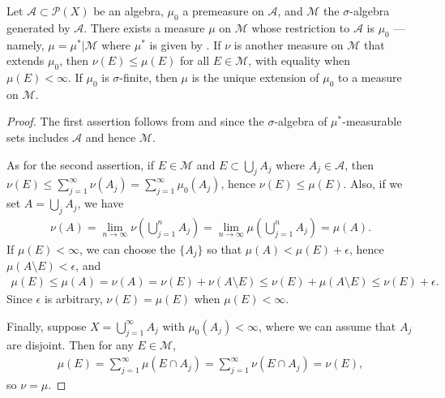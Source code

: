 \begin{theorem}
    Let $\mathcal{A} \subset \mathcal{P}(X)$ be an algebra, $\mu_0$ a premeasure on $\mathcal{A}$, and $\mathcal{M}$ the $\sigma$-algebra generated by $\mathcal{A}$.
    There exists a measure $\mu$ on $\mathcal{M}$ whose restriction to $\mathcal{A}$ is $\mu_0$ --- namely, $\mu = \mu^* | \mathcal{M}$ where $\mu^*$ is given by .
    If $\nu$ is another measure on $\mathcal{M}$ that extends $\mu_0$, then $\nu(E) \le \mu(E)$ for all $E \in \mathcal{M}$, with equality when $\mu(E) < \infty$.
    If $\mu_0$ is $\sigma$-finite, then $\mu$ is the unique extension of $\mu_0$ to a measure on $\mathcal{M}$.
\end{theorem}

\begin{proof}
    The first assertion follows from  and  since the $\sigma$-algebra of $\mu^*$-measurable sets includes $\mathcal{A}$ and hence $\mathcal{M}$.

    As for the second assertion, if $E \in \mathcal{M}$ and $E \subset \bigcup_{j} A_j$ where $A_j \in \mathcal{A}$, then $\nu(E) \le \sum_{j=1}^{\infty} \nu(A_j) = \sum_{j=1}^{\infty} \mu_0(A_j)$, hence $\nu(E) \le \mu(E)$.
    Also, if we set $A = \bigcup_{j} A_j$, we have
    \begin{align}
        \nu(A) = \lim_{n \to \infty} \nu\left( \bigcup_{j=1}^{n} A_j \right) = \lim_{n \to \infty} \mu\left( \bigcup_{j=1}^{n} A_j \right) = \mu(A).
    \end{align}
    If $\mu(E) < \infty$, we can choose the $\{A_j\}$ so that $\mu(A) < \mu(E) + \epsilon$, hence $\mu(A \setminus E) < \epsilon$, and 
    \begin{align}
        \mu(E) \le \mu(A) = \nu(A) = \nu(E) + \nu(A \setminus E) \le \nu(E) + \mu(A \setminus E) \le \nu(E) + \epsilon.
    \end{align}
    Since $\epsilon$ is arbitrary, $\nu(E) = \mu(E)$ when $\mu(E) < \infty$.

    Finally, suppose $X = \bigcup_{j=1}^{\infty} A_j$ with $\mu_0(A_j) < \infty$, where we can assume that $A_j$ are disjoint.
    Then for any $E \in \mathcal{M}$,
    \begin{align}
        \mu(E) = \sum_{j=1}^{\infty} \mu(E \cap A_j) = \sum_{j=1}^{\infty} \nu(E \cap A_j) = \nu(E),
    \end{align}
    so $\nu = \mu$.
\end{proof}

